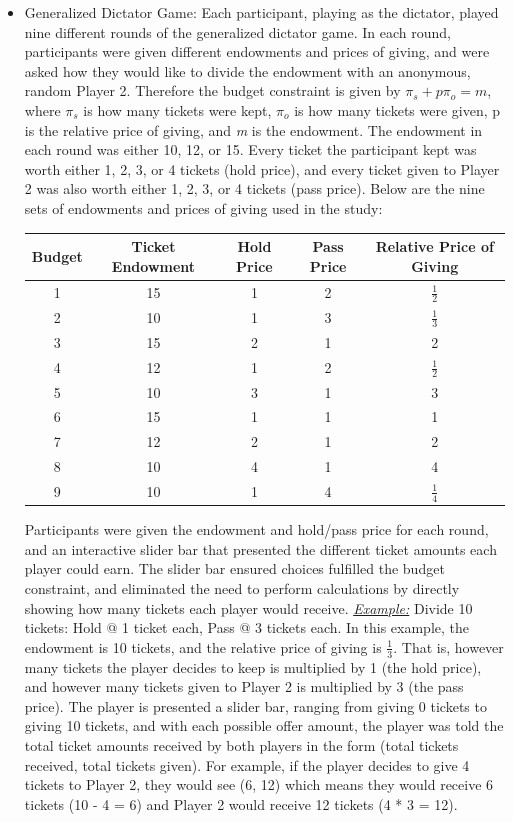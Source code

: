 \documentclass[12pt]{article}
\begin{document}
\begin{itemize}

\item{Generalized Dictator Game}:  Each participant, playing as the dictator, played nine different rounds of the generalized dictator game. In each round, participants were given different endowments and prices of giving, and were asked how they would like to divide the endowment with an anonymous, random Player 2. Therefore the budget constraint is given by \(\pi_{s} + p\pi_{o} = \textit{m}\), where \(\pi_{s}\) is how many tickets were kept, \(\pi_{o}\) is how many tickets were given, p is the relative price of giving, and \textit{m} is the endowment. The endowment in each round was either 10, 12, or 15. Every ticket the participant kept was worth either 1, 2, 3, or 4 tickets (hold price), and every ticket given to Player 2 was also worth either 1, 2, 3, or 4 tickets (pass price). Below are the nine sets of endowments and prices of giving used in the study:

\begin{center}
\begin{tabular}{ c c c c c }
\hline \hline
 Budget & Ticket Endowment & Hold Price & Pass Price & Relative Price of Giving \\ 
 \hline
1 & 15 & 1 & 2 & \(\frac{1}{2}\)  \\  
2 & 10 & 1 & 3 & \(\frac{1}{3}\)  \\  
3 & 15 & 2 & 1 & 2 \\  
4 & 12 & 1 & 2 & \(\frac{1}{2}\)  \\  
5 & 10 & 3 & 1 & 3  \\  
6 & 15 & 1 & 1 & 1  \\  
7 & 12 & 2 & 1 & 2 \\  
8 & 10 & 4 & 1 & 4 \\  
9 & 10 & 1 & 4 & \(\frac{1}{4}\)  \\  
\hline \hline
\end{tabular}
\end{center}

Participants were given the endowment and hold/pass price for each round, and an interactive slider bar that presented the different ticket amounts each player could earn. The slider bar ensured choices fulfilled the budget constraint, and eliminated the need to perform calculations by directly showing how many tickets each player would receive.
\subitem \underline{\textit{Example:}} Divide 10 tickets: Hold @ 1 ticket each, Pass @ 3 tickets each. In this example, the endowment is 10 tickets, and the relative price of giving is \(\frac{1}{3}\). That is, however many tickets the player decides to keep is multiplied by 1 (the hold price), and however many tickets given to Player 2 is multiplied by 3 (the pass price). The player is presented a slider bar, ranging from giving 0 tickets to giving 10 tickets, and with each possible offer amount, the player was told the total ticket amounts received by both players in the form (total tickets received, total tickets given). For example, if the player decides to give 4 tickets to Player 2, they would see (6, 12) which means they would receive 6 tickets (10 - 4 = 6) and Player 2 would receive 12 tickets (4 * 3 = 12).


\end{itemize}
\end{document}
